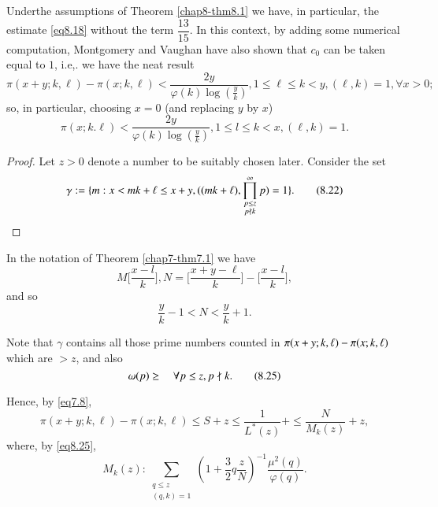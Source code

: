 \begin{remark*}
Under\pageoriginale the assumptions of Theorem \ref{chap8-thm8.1} we
have, in particular, the estimate \eqref{eq8.18} without the term
$\dfrac{13}{15}$. In this context, 
by adding some numerical computation, Montgomery and Vaughan have also
shown that $c_0$ can be taken equal to $1$, i.e,. we have the neat
result  
\begin{equation*}
\pi (x + y ; k, \ell ) -\pi (x; k,\ell ) < \frac{2y}{\varphi (k) \log
  (\frac{y}{k})}, 1 \leq \ell \leq k < y, (\ell ,k) = 1, \forall x >
0; \tag{8.20}\label{eq8.20} 
\end{equation*}
so, in particular, choosing $x = 0$ (and replacing $y$ by $x$)
\begin{equation*}
\pi (x; k. \ell ) < \frac{2y}{\varphi (k) \log (\frac{y}{k})}, 1 \leq
l \leq k < x, (\ell ,k) = 1. \tag{8.21}\label{eq8.21} 
\end{equation*}
\end{remark*}

\begin{proof}
Let $z > 0$ denote a number to be suitably chosen later. Consider the
set  
\begin{equation*}
\gamma : =\{ m: x < mk + \ell \leq x + y, ((mk +\ell ),
\prod^{\infty}_{\substack{p \leq z \\ p \not\mid k}}p) = 1 \}
. \tag{8.22}\label{eq8.22} 
\end{equation*}
\end{proof}

In the notation of Theorem \ref{chap7-thm7.1} we have 
\begin{equation*}
M \bigg[ \frac{x-l}{k} \bigg] , N = \bigg[ \frac{x+y-\ell}{k}\bigg]-
\bigg[ \frac{x-l}{k}\bigg] , \tag{8.23}\label{eq8.23} 
\end{equation*}
and so 
\begin{equation*}
\frac{y}{k}-1 < N < \frac{y}{k}+1. \tag{8.24}\label{eq8.24}
\end{equation*}

Note that $\gamma $ contains all those prime numbers counted in $\pi
(x+y;\break k,\ell ) - \pi (x; k,\ell )$ which are $ > z$, and also  
\begin{equation*}
\omega (p) \geq  \quad \forall p \leq z, p \not \mid
k. \tag{8.25}\label{eq8.25} 
\end{equation*}

Hence, by \eqref{eq7.8},
\begin{equation*}
\pi (x+y; k,\ell ) - \pi (x; k,\ell ) \leq S + z \leq
\frac{1}{L^*(z)}+ \leq \frac{N}{M_k(z)}+ z, \tag{8.26}\label{eq8.26} 
\end{equation*}
where, by \eqref{eq8.25}, 
\begin{equation*}
M_k(z) : \sum_{\substack{q\leq z \\ (q, k) =1}} ( 1 + \frac{3}{2} q
\frac{z}{N})^{-1} \frac{\mu^2 (q)}{\varphi
  (q)}. \tag{8.27}\label{eq8.27}  
\end{equation*}

